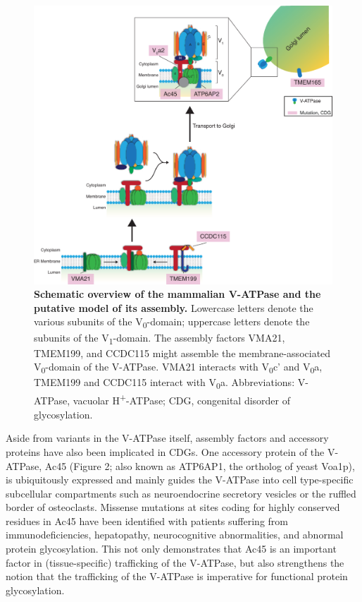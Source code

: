 \begin{figure}
    \includegraphics[keepaspectratio=true,width=\textwidth,height=\textheight]{chapters/chapter2/chapter2_Figure2}
    \caption{\textbf{Schematic overview of the mammalian V-ATPase and the putative model of its assembly.} Lowercase letters denote the various subunits of the V\textsubscript{0}-domain; uppercase letters denote the subunits of the V\textsubscript{1}-domain. The assembly factors VMA21, TMEM199, and CCDC115 might assemble the membrane-associated V\textsubscript{0}-domain of the V-ATPase. VMA21 interacts with V\textsubscript{0}c’ and V\textsubscript{0}a\cite{davis-kaplan_pkr1_2006,malkus_role_2004,esmail_n-linked_2016,esmail_n-linked_2017}, TMEM199 and CCDC115 interact with V\textsubscript{0}a\cite{graham_structure_2003}. Abbreviations: V-ATPase, vacuolar H\textsuperscript{+}-ATPase; CDG, congenital disorder of glycosylation.}
    \label{fig:ch2fig2}
\end{figure}

Aside from variants in the V-ATPase itself, assembly factors and accessory proteins have also been implicated in CDGs. One accessory protein of the V-ATPase, Ac45 (Figure 2; also known as ATP6AP1, the ortholog of yeast Voa1p), is ubiquitously expressed\cite{feng_cytoplasmic_2008,hodi_atp6s1_2002,holthuis_biosynthesis_1999,supek_novel_1994} and mainly guides the V-ATPase into cell type-specific subcellular compartments such as neuroendocrine secretory vesicles\cite{jansen_accessory_2008,jansen_v-atpase-mediated_2010} or the ruffled border of osteoclasts\cite{feng_cytoplasmic_2008,qin_versatile_2011,yang_v-atpase_2012}. Missense mutations at sites coding for highly conserved residues in Ac45 have been identified\cite{jansen_atp6ap1_2016} with patients suffering from immunodeficiencies, hepatopathy, neurocognitive abnormalities, and abnormal protein glycosylation. This not only demonstrates that Ac45 is an important factor in (tissue-specific) trafficking of the V-ATPase, but also strengthens the notion that the trafficking of the V-ATPase is imperative for functional protein glycosylation.

